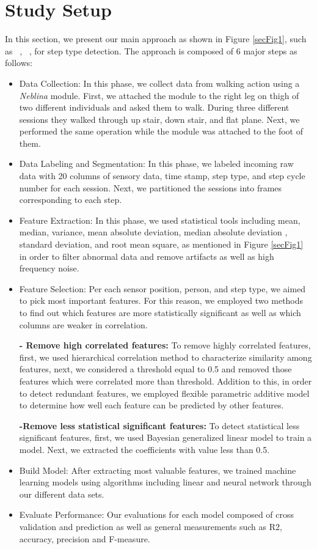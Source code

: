 \section{Study Setup}
In this section, we present our main approach as shown in Figure \ref{secFig1}, such as ~\cite{janidarmian2017comprehensive}, ~\cite{s131217472}, for step type detection. The approach is composed of 6 major steps as follows:
\begin{itemize}
  \item Data Collection: In this phase, we collect data from walking action using a \textit{Neblina} module. First, we attached the module to the right leg on thigh of two different individuals and asked them to walk. During three different sessions they walked through up stair, down stair, and flat plane. Next, we performed the same operation while the module was attached to the foot of them.
  \item Data Labeling and Segmentation: In this phase, we labeled incoming raw data with 20 columns of sensory data, time stamp, step type, and step cycle number for each session. Next, we partitioned the sessions into frames corresponding to each step.
  \item Feature Extraction: In this phase, we used statistical tools including mean, median, variance, mean absolute deviation, median absolute deviation , standard deviation, and root mean square, as mentioned in Figure \ref{secFig1} in order to filter abnormal data and remove artifacts as well as high frequency noise.

  \item Feature Selection: Per each sensor position, person, and step type, we aimed to pick most important features. For this reason, we employed two methods to find out which features are more statistically significant as well as which columns are weaker in correlation.

      \textbf{- Remove high correlated features:} To remove highly correlated features, first, we used hierarchical correlation method to characterize similarity among features, next, we considered a threshold equal to 0.5 and removed those features which were correlated more than threshold. Addition to this, in order to detect redundant features, we employed flexible parametric additive model to determine how well each feature can be predicted by other features.

      \textbf{-Remove less statistical significant features:} To detect statistical less significant features, first, we used Bayesian generalized linear model to train a model. Next, we extracted the coefficients with value less than 0.5.

  \item Build Model: After extracting most valuable features, we trained machine learning models using algorithms including linear and neural network through our different data sets.

  \item Evaluate Performance: Our evaluations for each model composed of cross validation and prediction as well as general measurements such as R2, accuracy, precision and F-measure.
\end{itemize}
